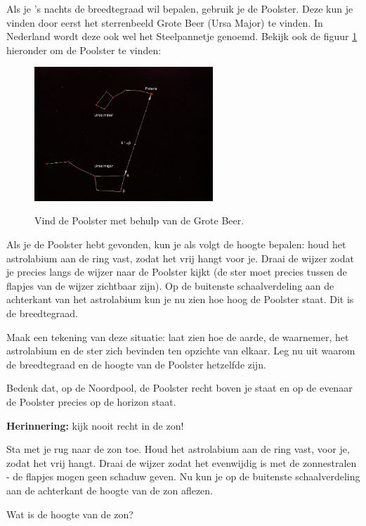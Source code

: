 Als je 's nachts de breedtegraad wil bepalen, gebruik je de Poolster. Deze kun je vinden door eerst het sterrenbeeld Grote Beer (Ursa Major) te vinden. In Nederland wordt deze ook wel het Steelpannetje genoemd. Bekijk ook de figuur \ref{poolster} hieronder om de Poolster te vinden:
\begin{figure}[h]
\centering
 \includegraphics[width=0.6\textwidth]{Polaris.jpg}
 \label{poolster}
 \caption{Vind de Poolster met behulp van de Grote Beer.}
\end{figure}

Als je de Poolster hebt gevonden, kun je als volgt de hoogte bepalen: houd het astrolabium aan de ring vast, zodat het vrij hangt voor je. Draai de wijzer zodat je precies langs de wijzer naar de Poolster kijkt (de ster moet precies tussen de flapjes van de wijzer zichtbaar zijn). Op de buitenste schaalverdeling aan de achterkant van het astrolabium kun je nu zien hoe hoog de Poolster staat. Dit is de breedtegraad.

\begin{opgave}
Maak een tekening van deze situatie: laat zien hoe de aarde, de waarnemer, het astrolabium en de ster zich bevinden ten opzichte van elkaar. Leg nu uit waarom de breedtegraad en de hoogte van de Poolster hetzelfde zijn.
\begin{hint}
 Bedenk dat, op de Noordpool, de Poolster recht boven je staat en op de evenaar de Poolster precies op de horizon staat.
\end{hint}
\end{opgave}

\textbf{Herinnering: } kijk nooit recht in de zon!
\begin{opgave}[\schaar]
 \label{astrolabium:breedtegraad}
 Sta met je rug naar de zon toe. Houd het astrolabium aan de ring vast, voor je, zodat het vrij hangt. Draai de wijzer zodat het evenwijdig is met de zonnestralen - de flapjes mogen geen schaduw geven. Nu kun je op de buitenste schaalverdeling aan de achterkant de hoogte van de zon aflezen. 
 \begin{subopgave}
  Wat is de hoogte van de zon?
 \end{subopgave}
\end{opgave}

